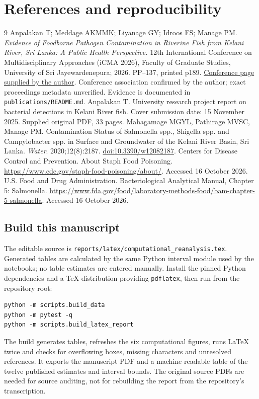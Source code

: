 \documentclass[11pt,a4paper]{article}
\newcommand{\sectiontitle}[1]{\section{\color{ink}#1}}
\begin{document}
\clearpage
\sectiontitle{References and reproducibility}
\begingroup\small
\renewcommand{\refname}{Sources}
\begin{thebibliography}{9}
 Anpalakan T; Meddage AKMMK; Liyanage GY; Idroos FS; Manage PM.
\emph{Evidence of Foodborne Pathogen Contamination in Riverine Fish from Kelani River, Sri Lanka: A Public Health Perspective.} 12th International Conference on Multidisciplinary Approaches (iCMA 2026), Faculty of Graduate Studies, University of Sri Jayewardenepura; 2026. PP--137, printed p189. \href{http://graduate.sjp.ac.lk/icma/icma-2026}{Conference page supplied by the author}. Conference association confirmed by the author; exact proceedings metadata unverified. Evidence is documented in \texttt{publications/README.md}.
 Anpalakan T. University research project report on bacterial detections in Kelani River fish. Cover submission date: 15 November 2025. Supplied original PDF, 33 pages.
 Mahagamage MGYL, Pathirage MVSC, Manage PM. Contamination Status of Salmonella spp., Shigella spp. and Campylobacter spp. in Surface and Groundwater of the Kelani River Basin, Sri Lanka. \emph{Water}. 2020;12(8):2187. \href{https://doi.org/10.3390/w12082187}{doi:10.3390/w12082187}.
 Centers for Disease Control and Prevention. About Staph Food Poisoning. \url{https://www.cdc.gov/staph-food-poisoning/about/}. Accessed 16 October 2026.
 U.S. Food and Drug Administration. Bacteriological Analytical Manual, Chapter 5: Salmonella. \url{https://www.fda.gov/food/laboratory-methods-food/bam-chapter-5-salmonella}. Accessed 16 October 2026.
\end{thebibliography}
\endgroup

\subsection*{Build this manuscript}
The editable source is \texttt{reports/latex/computational\_reanalysis.tex}. Generated tables are calculated by the same Python interval module used by the notebooks; no table estimates are entered manually. Install the pinned Python dependencies and a TeX distribution providing \texttt{pdflatex}, then run from the repository root:
\begin{verbatim}
python -m scripts.build_data
python -m pytest -q
python -m scripts.build_latex_report
\end{verbatim}
The build generates tables, refreshes the six computational figures, runs LaTeX twice and checks for overflowing boxes, missing characters and unresolved references. It exports the manuscript PDF and a machine-readable table of the twelve published estimates and interval bounds. The original source PDFs are needed for source auditing, not for rebuilding the report from the repository's transcription.
\end{document}
